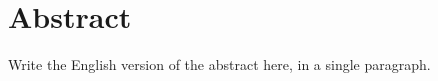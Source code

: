 
\chapter{Abstract}

\begin{otherlanguage}{english}
\noindent Write the English version of the abstract here, in a single paragraph. \lipsum[1][1-8]

\end{otherlanguage}
